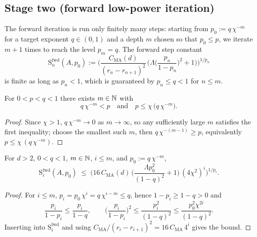\subsection{Stage two (forward low-power iteration)}

The forward iteration is run only finitely many steps: starting from
$p_0 := q\,\chi^{-m}$ for a target exponent $q \in (0,1)$ and a depth $m$
chosen so that $p_0 \leq p$, we iterate $m+1$ times to reach the level $p_m =
q$. The forward step constant
\begin{equation*}
  \mathrm{S}_n^{\mathrm{fwd}}(A,p_0) :=
  \Big(\frac{C_{\mathrm{MA}}(d)}{(r_n-r_{n+1})^{2}}\,
    \Big(\Lambda\Big(\frac{p_n}{1-p_n}\Big)^{2}+1\Big)\Big)^{1/p_n}
\end{equation*}
 is finite as long as $p_n < 1$, which is
guaranteed by $p_n \leq q < 1$ for $n \leq m$.

\begin{lemma}
\label{lem:fwd-depth}
\leanok
For $0 < p < q < 1$ there exists $m \in \mathbb{N}$ with
\begin{equation*}
  q\,\chi^{-m} < p \quad \text{and} \quad p \leq \chi\,\big(q\,\chi^{-m}\big).
\end{equation*}
\end{lemma}

\begin{proof}
\leanok
{}

Since $\chi > 1$, $q\,\chi^{-m} \to 0$ as $m \to \infty$, so any sufficiently
large $m$ satisfies the first inequality; choose the smallest such $m$, then
$q\,\chi^{-(m-1)} \geq p$, equivalently $p \leq \chi\,(q\,\chi^{-m})$.
\end{proof}

\begin{lemma}
\label{lem:superStepConstFwd_le}
\leanok
{}
For $d>2$, $0 < q < 1$, $m \in \mathbb{N}$, $i \leq m$, and $p_0 := q\,\chi^{-m}$,
\begin{equation*}
  \mathrm{S}_i^{\mathrm{fwd}}(A,p_0)
  \;\leq\;
  \Big(16\,C_{\mathrm{MA}}(d)\,\Big(\frac{\Lambda p_0^{2}}{(1-q)^{2}}+1\Big)\,
  (4\chi^{2})^{i}\Big)^{1/p_i}.
\end{equation*}
\end{lemma}

\begin{proof}
\leanok
{}

For $i \leq m$, $p_i = p_0\,\chi^{i} = q\,\chi^{i-m} \leq q$, hence
$1 - p_i \geq 1 - q > 0$ and
\begin{equation*}
  \frac{p_i}{1-p_i} \leq \frac{p_i}{1-q}, \qquad
  \Big(\frac{p_i}{1-p_i}\Big)^{2}\leq \frac{p_i^{2}}{(1-q)^{2}}
  \leq \frac{p_0^{2}\chi^{2i}}{(1-q)^{2}}.
\end{equation*}
Inserting into $\mathrm{S}_i^{\mathrm{fwd}}$ and using
$C_{\mathrm{MA}}/(r_i - r_{i+1})^{2} = 16\,C_{\mathrm{MA}}\,4^{i}$ gives the bound.
\end{proof}

